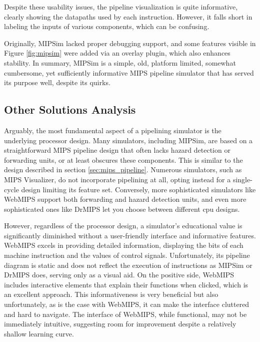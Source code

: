 Despite these usability issues, the pipeline visualization is quite informative, clearly showing the datapaths used by each instruction. However, it falls short in labeling the inputs of various components, which can be confusing. 

Originally, MIPSim lacked proper debugging support, and some features visible in Figure \ref{fig:mipsim} were added via an overlay plugin, which also enhances stability. In summary, MIPSim is a simple, old, platform limited, somewhat cumbersome, yet sufficiently informative MIPS pipeline simulator that has served its purpose well, despite its quirks.


\subsection{Other Solutions Analysis}\label{sec:other_solutions_analysis}

Arguably, the most fundamental aspect of a pipelining simulator is the underlying processor design. Many simulators, including MIPSim, are based on a straightforward MIPS pipeline design that often lacks hazard detection or forwarding units, or at least obscures these components. This is similar to the design described in section \ref{sec:mips_pipeline}. Numerous simulators, such as MIPS Visualizer, do not incorporate pipelining at all, opting instead for a single-cycle design limiting its feature set. Conversely, more sophisticated simulators like WebMIPS support both forwarding and hazard detection units, and even more sophisticated ones like DrMIPS let you choose between different cpu designs.

However, regardless of the processor design, a simulator's educational value is significantly diminished without a user-friendly interface and informative features. WebMIPS excels in providing detailed information, displaying the bits of each machine instruction and the values of control signals. Unfortunately, its pipeline diagram is static and does not reflect the execution of instructions as MIPSim or DrMIPS does, serving only as a visual aid. On the positive side, WebMIPS includes interactive elements that explain their functions when clicked, which is an excellent approach. This informativeness is very beneficial but also unfortunately, as is the case with WebMIPS, it can make the interface cluttered and hard to navigate. The interface of WebMIPS, while functional, may not be immediately intuitive, suggesting room for improvement despite a relatively shallow learning curve. 

